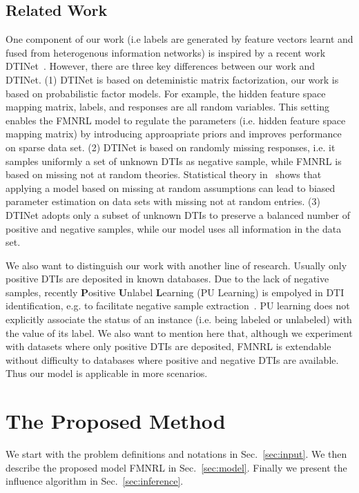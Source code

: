 \documentclass[sigconf,anonymous]{acmart}
\begin{document}
\subsection{Related Work}
One component of our work (i.e labels are generated by feature vectors learnt and fused from heterogenous information networks) is inspired by a recent work DTINet~\cite{Luo2017Network}. However, there are three key differences between our work and DTINet. (1) DTINet is based on deteministic matrix factorization, our work is based on probabilistic factor models. For example, the hidden feature space mapping matrix, labels, and responses are all random variables. This setting enables the FMNRL model to regulate the parameters (i.e. hidden feature space mapping matrix) by introducing approapriate priors and improves performance on sparse data set. (2) DTINet is based on randomly missing responses, i.e. it samples uniformly a set of unknown DTIs as negative sample, while FMNRL is based on missing not at random theories. Statistical theory in~\cite{Little1987Statistical} shows that applying a model based on missing at random assumptions can lead to biased parameter estimation on data sets with missing not at random entries. (3) DTINet adopts only a subset of unknown DTIs to preserve a balanced number of positive and negative samples, while our model uses all information in the data set.

We also want to distinguish our work with another line of research. Usually only positive DTIs are deposited in known databases. Due to the lack of negative samples, recently \textbf{P}ositive \textbf{U}nlabel \textbf{L}earning (PU Learning) is empolyed in DTI identification, e.g. to facilitate negative sample extraction~\cite{Peng2017Screening}. PU learning does not explicitly associate the status of an instance (i.e. being labeled or unlabeled) with the value of its label. We also want to mention here that, although we experiment with datasets where only positive DTIs are deposited, FMNRL is extendable without difficulty to databases where positive and negative DTIs are available. Thus our model is applicable in more scenarios.



\section{The Proposed Method}\label{sec:method}
We start with the problem definitions and notations in Sec.~\ref{sec:input}. We then describe the proposed model FMNRL in Sec.~\ref{sec:model}. Finally we present the influence algorithm in Sec.~\ref{sec:inference}.
\end{document}
